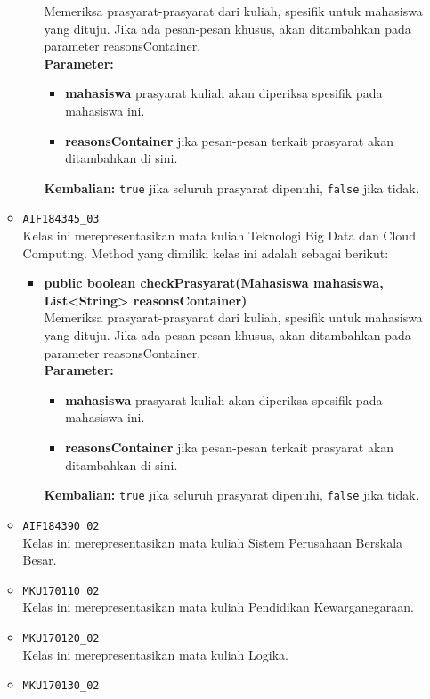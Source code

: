 \begin{enumerate}
\begin{itemize}
\begin{itemize}
			Memeriksa prasyarat-prasyarat dari kuliah, spesifik untuk mahasiswa yang dituju. Jika ada pesan-pesan khusus, akan ditambahkan pada parameter reasonsContainer.\\
			\textbf{Parameter:}
			\begin{itemize}
				\item \textbf{mahasiswa} prasyarat kuliah akan diperiksa spesifik pada mahasiswa ini.
				\item \textbf{reasonsContainer} jika pesan-pesan terkait prasyarat akan ditambahkan di sini.
			\end{itemize}
			\textbf{Kembalian:} \texttt{true} jika seluruh prasyarat dipenuhi, \texttt{false} jika tidak.
		\end{itemize}
		\item \texttt{AIF184345\_03} \\
		Kelas ini merepresentasikan mata kuliah Teknologi Big Data dan Cloud Computing. Method yang dimiliki kelas ini adalah sebagai berikut: 
		\begin{itemize}
			\item \textbf{public boolean checkPrasyarat(Mahasiswa mahasiswa, List<String> reasonsContainer)}\\
			Memeriksa prasyarat-prasyarat dari kuliah, spesifik untuk mahasiswa yang dituju. Jika ada pesan-pesan khusus, akan ditambahkan pada parameter reasonsContainer.\\
			\textbf{Parameter:}
			\begin{itemize}
				\item \textbf{mahasiswa} prasyarat kuliah akan diperiksa spesifik pada mahasiswa ini.
				\item \textbf{reasonsContainer} jika pesan-pesan terkait prasyarat akan ditambahkan di sini.
			\end{itemize}
			\textbf{Kembalian:} \texttt{true} jika seluruh prasyarat dipenuhi, \texttt{false} jika tidak.
		\end{itemize}
		\item \texttt{AIF184390\_02} \\
		Kelas ini merepresentasikan mata kuliah Sistem Perusahaan Berskala Besar.
		\item \texttt{MKU170110\_02} \\
		Kelas ini merepresentasikan mata kuliah Pendidikan Kewarganegaraan.
		\item \texttt{MKU170120\_02} \\
		Kelas ini merepresentasikan mata kuliah Logika.
		\item \texttt{MKU170130\_02} \\

\end{itemize}
\end{enumerate}
